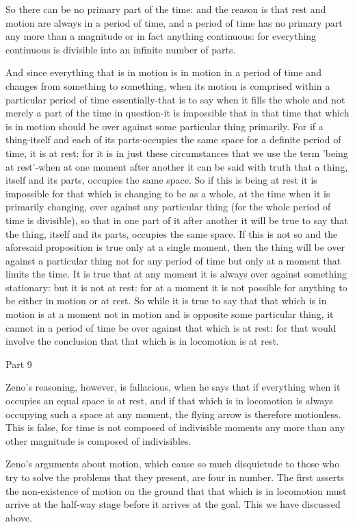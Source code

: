 So there can be no primary part of the time: and the reason is that
rest and motion are always in a period of time, and a period of time
has no primary part any more than a magnitude or in fact anything
continuous: for everything continuous is divisible into an infinite
number of parts. 

And since everything that is in motion is in motion in a period of
time and changes from something to something, when its motion is comprised
within a particular period of time essentially-that is to say when
it fills the whole and not merely a part of the time in question-it
is impossible that in that time that which is in motion should be
over against some particular thing primarily. For if a thing-itself
and each of its parts-occupies the same space for a definite period
of time, it is at rest: for it is in just these circumstances that
we use the term 'being at rest'-when at one moment after another it
can be said with truth that a thing, itself and its parts, occupies
the same space. So if this is being at rest it is impossible for that
which is changing to be as a whole, at the time when it is primarily
changing, over against any particular thing (for the whole period
of time is divisible), so that in one part of it after another it
will be true to say that the thing, itself and its parts, occupies
the same space. If this is not so and the aforesaid proposition is
true only at a single moment, then the thing will be over against
a particular thing not for any period of time but only at a moment
that limits the time. It is true that at any moment it is always over
against something stationary: but it is not at rest: for at a moment
it is not possible for anything to be either in motion or at rest.
So while it is true to say that that which is in motion is at a moment
not in motion and is opposite some particular thing, it cannot in
a period of time be over against that which is at rest: for that would
involve the conclusion that that which is in locomotion is at rest.

Part 9

Zeno's reasoning, however, is fallacious, when he says that if everything
when it occupies an equal space is at rest, and if that which is in
locomotion is always occupying such a space at any moment, the flying
arrow is therefore motionless. This is false, for time is not composed
of indivisible moments any more than any other magnitude is composed
of indivisibles. 

Zeno's arguments about motion, which cause so much disquietude to
those who try to solve the problems that they present, are four in
number. The first asserts the non-existence of motion on the ground
that that which is in locomotion must arrive at the half-way stage
before it arrives at the goal. This we have discussed above.

